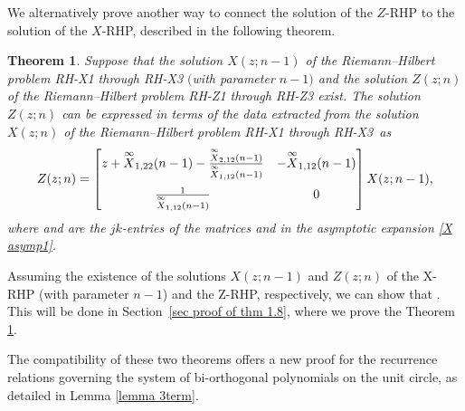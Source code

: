\documentclass[10pt,a4paper]{amsart}
\numberwithin{equation}{section}
\newtheorem{Theorem}{Theorem}[section]
\begin{document}
	We alternatively prove another way to connect the solution of the $Z$-RHP to the solution of the $X$-RHP, described in the following theorem.
	\begin{Theorem}\label{thmXZ intro} Suppose that the solution $X(z;n-1)$ of the Riemann--Hilbert problem \mbox{{\rm RH-X1}} through {\rm RH-X3} $($with parameter $n-1)$ and the solution $Z(z;n)$ of the Riemann--Hilbert problem {\rm RH-Z1} through {\rm RH-Z3} exist. The solution $Z(z;n)$ can be expressed in terms of the data extracted from the solution $X(z;n)$ of the Riemann--Hilbert problem {\rm RH-X1} through {\rm RH-X3}~as%
		\begin{equation}\label{Z in terms of X1}
			Z(z;n) = \begin{bmatrix}
				z + \overset{\infty}{X}_{1,22}(n-1) - \tfrac{\overset{\infty}{X}_{2,12}(n-1)}{\overset{\infty}{X}_{1,12}(n-1)} & -\overset{\infty}{X}_{1,12}(n-1) \vspace{6pt}\\
				\tfrac{1}{\overset{\infty}{X}_{1,12}(n-1)} & 0
			\end{bmatrix} X(z;n-1),
		\end{equation} where  and  are the $jk$-entries of the matrices  and  in the asymptotic expansion \eqref{X asymp1}.
	\end{Theorem}
	
\begin{Remark}
		Assuming the existence of the solutions $X(z;n-1)$ and $Z(z;n)$ of the X-RHP (with parameter $n-1$) and the Z-RHP, respectively, we can show that . This will be done in
		Section~\ref{sec proof of thm 1.8}, where we prove the Theorem \ref{thmXZ intro}.
	\end{Remark}
	
	\begin{Remark}
		The compatibility of these two theorems offers a new proof for the recurrence relations governing the system of bi-orthogonal polynomials on the unit circle, as detailed in Lemma \ref{lemma 3term}.	
	\end{Remark}
	
\end{document}
